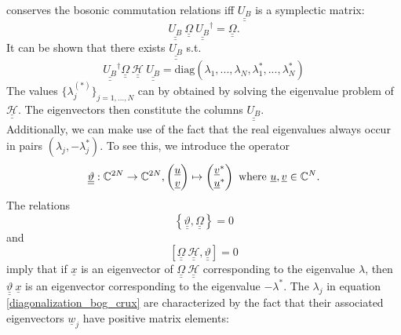 conserves the bosonic commutation relations iff $\underline{\underline{U_B}}$ is a symplectic matrix:
\begin{equation}\underline{\underline{U_B}}\ {\underline{\underline{\Omega}}}\ \underline{\underline{U_B}}^\dagger={\underline{\underline{\Omega}}}.\end{equation}
It can be shown that there exists $\underline{\underline{U_B}}$ s.t.
\begin{equation}\label{diagonalization_bog_crux}
\underline{\underline{U_B}}^\dagger {\underline{\underline{\Omega}}}\ {\underline{\underline{\mathscr{H}}}}\ \underline{\underline{U_B}}=\mathrm{diag}\left(\lambda_1,...,\lambda_N,\lambda_1^*,...,\lambda_N^*\right)
\end{equation}
The values $\{\lambda_j^{(*)}\}_{j=1,...,N}$ can by obtained by solving the eigenvalue problem of ${\underline{\underline{\mathscr{H}}}}$. The eigenvectors then constitute the columns $\underline{\underline{U_B}}$. \\
Additionally, we can make use of the fact that the real eigenvalues always occur in pairs $(\lambda_j,-\lambda_j^*)$. To see this, we introduce the operator \begin{equation}\underline{\underline{\vartheta}}:\C^{2N}\rightarrow \C^{2N},\begin{pmatrix} \underline u\\ \underline v\end{pmatrix}\mapsto \begin{pmatrix} \underline v^*\\ \underline u^*\end{pmatrix}\ \mathrm{where}\ \underline u,\underline v\in\C^N.\end{equation}
The relations 
\begin{equation}
\left\{\underline{\underline{\vartheta}},{\underline{\underline{\Omega}}}\right\}=0
\end{equation}
and \begin{equation} \left[ {\underline{\underline{\Omega}}}\ {\underline{\underline{\mathscr{H}}}},\underline{\underline{\vartheta}}\right]=0\end{equation}
imply that if $\underline x$ is an eigenvector of ${\underline{\underline{\Omega}}}\ {\underline{\underline{\mathscr{H}}}}$ corresponding to the eigenvalue $\lambda$, then $\underline{\underline{\vartheta}}\ \underline x$ is an eigenvector corresponding to the eigenvalue $-\lambda^*$.
The $ \lambda_j$ in equation \ref{diagonalization_bog_crux} are characterized by the fact that their associated eigenvectors $\underline w_j$ have positive matrix elements:

